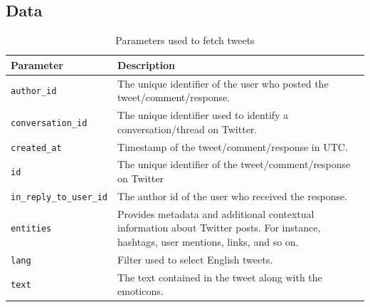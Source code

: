 \documentclass[acmtog]{acmart}
\begin{document}
\subsection{Data}
\begin{table}[]
\centering
\caption{Parameters used to fetch tweets}
\label{tab:params}
\begin{tabular}{|p{3cm}|p{4.8cm}|}
\hline
Parameter                                         & Description                                                                                                                          \\ \hline
\texttt{author\_id}              & The unique identifier of the user who posted the tweet/comment/response.                                                             \\
\texttt{conversation\_id}        & The unique identifier used to identify a conversation/thread on Twitter.                                                             \\
\texttt{created\_at}             & Timestamp of the tweet/comment/response in UTC.                                                                                      \\
\texttt{id}                      & The unique identifier of the tweet/comment/response on Twitter                                                                       \\
\texttt{in\_reply\_to\_user\_id} & The author id of the user who received the response.                                                                                 \\
\texttt{entities}                & Provides metadata and additional contextual information about Twitter posts. For instance, hashtags, user mentions, links, and so on. \\
\texttt{lang}                    & Filter used to select English tweets.                                                                                                \\
\texttt{text}                    & The text contained in the tweet along with the emoticons.                                                                            \\ \hline
\end{tabular}
\end{table}
\end{document}
